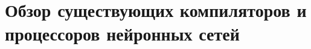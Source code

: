 \section{Обзор существующих компиляторов и процессоров нейронных сетей}
\label{sec:Chapter4} 



\newpage
